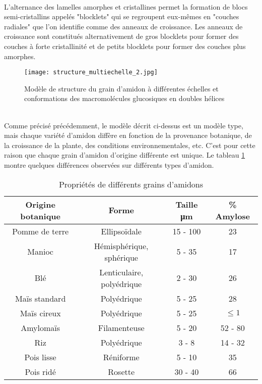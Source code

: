 	\\L'alternance des lamelles amorphes et cristallines permet la formation de blocs semi-cristallins appelés "blocklets" qui se regroupent eux-mêmes en "couches radiales" que l'on identifie comme des anneaux de croissance. Les anneaux de croissance sont constitués alternativement de gros blocklets pour former des couches à forte cristallinité et de petits blocklets pour former des couches plus amorphes.
	\begin{figure}\centering
		\texttt{[image: structure\_multiechelle\_2.jpg]}
		\caption{\label{fig03:structure_multiechelle}Modèle de structure du grain d'amidon à différentes échelles et conformations des macromolécules glucosiques en doubles hélices \citep{bemiller_starch:_2009}}
	\end{figure}
	\\Comme précisé précédemment, le modèle décrit ci-dessus est un modèle type, mais chaque variété d'amidon diffère en fonction de la provenance botanique, de la croissance de la plante, des conditions environnementales, etc. C'est pour cette raison que chaque grain d'amidon d'origine différente est unique. Le tableau \ref{tab03:difference_grains} montre quelques différences observées sur différents types d'amidon.
	\begin{table}\centering
		\begin{tabular}{cccc}
			\hline
			\textbf{Origine botanique} & \textbf{Forme} & \textbf{Taille \si{\micro\meter}} & \% \textbf{Amylose} \\ 
			\hline
			\hline
			Pomme de terre & Ellipsoïdale & 15 - 100 & 23 \\
			Manioc & Hémisphérique, sphérique & 5 - 35 & 17 \\
			Blé & Lenticulaire, polyédrique & 2 - 30 & 26 \\
			Maïs standard & Polyédrique & 5 - 25 & 28 \\
			Maïs cireux & Polyédrique & 5 - 25 & $\leq 1$ \\
			Amylomaïs & Filamenteuse & 5 - 20 & 52 - 80 \\
			Riz & Polyédrique & 3 - 8 & 14 - 32 \\
			Pois lisse & Réniforme & 5 - 10 & 35 \\
			Pois ridé & Rosette & 30 - 40 & 66 \\
			\hline
		\end{tabular}
		\caption{\label{tab03:difference_grains}Propriétés de différents grains d'amidons \citep{bemiller_starch:_2009}}
	\end{table}
